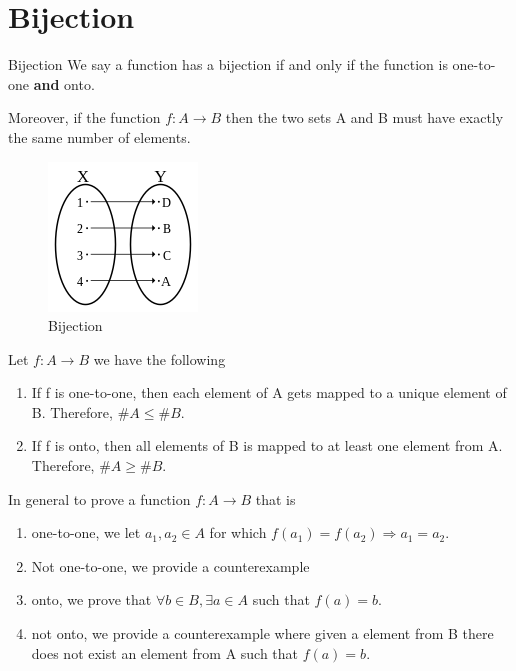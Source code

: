 \documentclass[../MATH-2000-Notes.tex]{subfiles}
\begin{document}
\section{Bijection}
\begin{Definition}
    {Bijection}
    We say a function has a bijection if and only if the function is one-to-one \textbf{and} onto.

    Moreover, if the function \(f: A \rightarrow B\) then the two sets A and B must have exactly the same number of elements.
\end{Definition}
\begin{figure}[h]
    \centering
    \includegraphics[width=0.6\columnwidth]{../Assets/150px-Bijection.svg.png}
    \caption{Bijection}
    \label{fig:bijection}
\end{figure}
\begin{Note}
    Let \(f: A \rightarrow B\) we have the following
    \begin{enumerate}
        \item If f is one-to-one, then each element of A gets mapped to a unique element of B. Therefore, \(\#A \leq \#B\).
        \item If f is onto, then all elements of B is mapped to at least one element from A. Therefore, \(\#A \geq \#B\).
    \end{enumerate}
\end{Note}
In general to prove a function \(f: A\rightarrow B\) that is
\begin{enumerate}
    \item one-to-one, we let \(a_1,a_2 \in A\) for which \(f(a_1) = f(a_2) \Rightarrow a_1 = a_2\).
    \item Not one-to-one, we provide a counterexample
    \item onto, we prove that \(\forall b \in B, \exists a \in A\) such that \(f(a) = b\).
    \item not onto, we provide a counterexample where given a element from B there does not exist an element from A such that \(f(a) = b\).
\end{enumerate}
\end{document}
